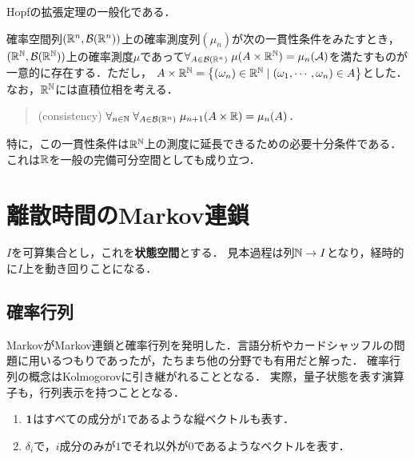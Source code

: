 \documentclass[uplatex,dvipdfmx]{jsreport}
\begin{document}
\begin{tcolorbox}[colframe=ForestGreen, colback=ForestGreen!10!white,breakable,colbacktitle=ForestGreen!40!white,coltitle=black,fonttitle=\bfseries\sffamily,
title=]
    Hopfの拡張定理の一般化である．
\end{tcolorbox}

\begin{theorem}\label{thm-Kolmogorov-extension-theorem}
    確率空間列$(\mathbb{R}^n,\mathcal{B}(\mathbb{R}^n))$上の確率測度列$(\mu_n)$が次の一貫性条件をみたすとき，$(\mathbb{R}^{\mathbb{N}},\mathcal{B}(\mathbb{R}^{\mathbb{N}}))$上の確率測度$\mu$であって$\forall_{A\in\mathcal{B}(\mathbb{R}^n)}\;\mu(A\times\mathbb{R}^{\mathbb{N}})=\mu_n(\mathcal{A})$を満たすものが一意的に存在する．ただし，
    $A\times\mathbb{R}^{\mathbb{N}}=\left\{(\omega_n)\in\mathbb{R}^{\mathbb{N}}\mid (\omega_1,\cdots,\omega_n)\in A\right\}$とした．
    なお，$\mathbb{R}^{\mathbb{N}}$には直積位相を考える．
    \begin{quotation}
        (consistency) $\forall_{n\in\mathbb{N}}\;\forall_{A\in\mathcal{B}(\mathbb{R}^n)}\;\mu_{n+1}(A\times\mathbb{R})=\mu_n(A)$．
    \end{quotation}
    特に，この一貫性条件は$\mathbb{R}^{\mathbb{N}}$上の測度に延長できるための必要十分条件である．
    これは$\mathbb{R}$を一般の完備可分空間としても成り立つ．
\end{theorem}

\section{離散時間のMarkov連鎖}

\begin{notation}
    $I$を可算集合とし，これを\textbf{状態空間}とする．
    見本過程は列$\mathbb{N}\to I$となり，経時的に$I$上を動き回りことになる．
\end{notation}

\subsection{確率行列}

\begin{history}
    MarkovがMarkov連鎖と確率行列を発明した．言語分析やカードシャッフルの問題に用いるつもりであったが，たちまち他の分野でも有用だと解った．
    確率行列の概念はKolmogorovに引き継がれることとなる．
    実際，量子状態を表す演算子も，行列表示を持つこととなる．
\end{history}

\begin{notation}\mbox{}
    \begin{enumerate}
        \item $\mathbf{1}$はすべての成分が$1$であるような縦ベクトルも表す．
        \item $\delta_i$で，$i$成分のみが$1$でそれ以外が$0$であるようなベクトルを表す．
    \end{enumerate}
\end{notation}
\end{document}
